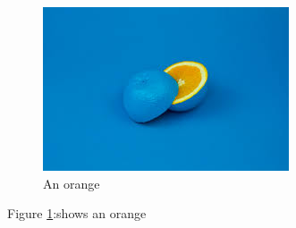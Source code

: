 \documentclass{article}
\begin{document}
	\begin{figure}
    	\includegraphics[width=\linewidth]{orange.jpg}
		\caption{An orange}
		\label{fig:orange1}
   	\end{figure}
   Figure \ref{fig:orange1}:shows an orange
 
\end{document}
